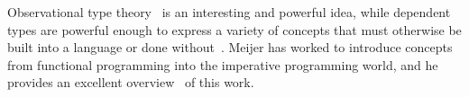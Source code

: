 Observational type theory~\citep{Altenkirch:Observational:2007} is an interesting and powerful idea, while dependent types are powerful enough to express a variety of concepts that must otherwise be built into a language or done without~\citep{Altenkirch:Why-Dependent:2005,McKinna:Why-dependent:2006}. Meijer has worked to introduce concepts from functional programming into the imperative programming world, and he provides an excellent overview~\citep{Meijer:Confessions:2007} of this work.

\fixmarks